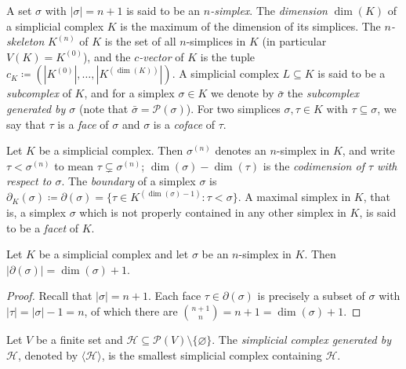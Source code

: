\begin{definition}
    A set $\sigma$ with $|\sigma| = n + 1$ is said to be an \emph{$n$-simplex}. The \emph{dimension} $\dim(K)$ of a simplicial
    complex $K$ is the maximum of the dimension of its simplices. The \emph{$n$-skeleton} $K^{(n)}$ of $K$ is the set of all
    $n$-simplices in $K$ (in particular $V(K) = K^{(0)}$), and the \emph{$c$-vector} of $K$ is the tuple $c_K \coloneqq
    (|K^{(0)}|, \dots, |K^{(\dim(K))}|)$. A simplicial complex $L \subseteq K$ is said to be a \emph{subcomplex}
    of $K$, and for a simplex $\sigma \in K$ we denote by $\bar{\sigma}$ the \emph{subcomplex generated by $\sigma$} (note
    that $\bar{\sigma} = \mathcal{P}(\sigma)$). For two simplices $\sigma, \tau \in K$ with $\tau \subseteq \sigma$, we say that
    $\tau$ is a \emph{face} of $\sigma$ and $\sigma$ is a \emph{coface} of $\tau$.
\end{definition}

\begin{definition}
    Let $K$ be a simplicial complex. Then $\sigma^{(n)}$ denotes an $n$-simplex in $K$, and write $\tau < \sigma^{(n)}$ to mean
    $\tau \subsetneq \sigma^{(n)}$; $\dim(\sigma) - \dim(\tau)$ is the \emph{codimension of $\tau$ with respect to $\sigma$}. The
    \emph{boundary} of a simplex $\sigma$ is $\partial_K(\sigma) \coloneqq \partial(\sigma) = \{\tau \in K^{(\dim(\sigma) - 1)}
    : \tau < \sigma\}$. A maximal simplex in $K$, that is, a simplex $\sigma$ which is not properly contained in any other simplex
    in $K$, is said to be a \emph{facet} of $K$.
\end{definition}

\begin{proposition}
    Let $K$ be a simplicial complex and let $\sigma$ be an $n$-simplex in $K$. Then $|\partial(\sigma)| = \dim(\sigma) + 1$.
\end{proposition}
\begin{proof}
    Recall that $|\sigma| = n + 1$. Each face $\tau \in \partial(\sigma)$ is precisely a subset of $\sigma$ with
    $|\tau| = |\sigma| - 1 = n$, of which there are $\binom{n+1}{n} = n+1 = \dim(\sigma) + 1$.
\end{proof}

\begin{definition}
    Let $V$ be a finite set and $\mathcal{H} \subseteq \mathcal{P}(V) \setminus \{\varnothing\}$. The \emph{simplicial complex generated by
    $\mathcal{H}$}, denoted by $\langle \mathcal{H} \rangle$, is the smallest simplicial complex containing $\mathcal{H}$.
\end{definition}

